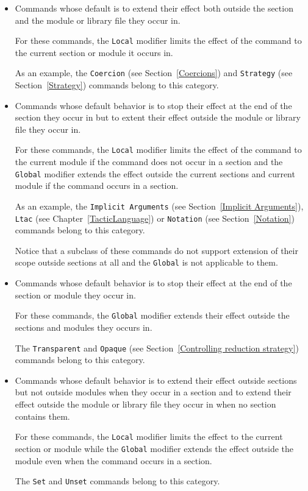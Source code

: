 \begin{itemize}
\item Commands whose default is to extend their effect both outside the
  section and the module or library file they occur in.

  For these commands, the {\tt Local} modifier limits the effect of
  the command to the current section or module it occurs in.

  As an example, the {\tt Coercion} (see Section~\ref{Coercions})
  and {\tt Strategy} (see Section~\ref{Strategy})
  commands belong to this category.

\item Commands whose default behavior is to stop their effect at the
  end of the section they occur in but to extent their effect outside
  the module or library file they occur in.

  For these commands, the {\tt Local} modifier limits the effect of
  the command to the current module if the command does not occur in a
  section and the {\tt Global} modifier extends the effect outside the
  current sections and current module if the command occurs in a
  section.

  As an example, the {\tt Implicit Arguments} (see
  Section~\ref{Implicit Arguments}), {\tt Ltac} (see
  Chapter~\ref{TacticLanguage}) or {\tt Notation} (see
  Section~\ref{Notation}) commands belong to this category.

  Notice that a subclass of these commands do not support extension of
  their scope outside sections at all and the {\tt Global} is not
  applicable to them.

\item Commands whose default behavior is to stop their effect at the
  end of the section or module they occur in.

  For these commands, the {\tt Global} modifier extends their effect
  outside the sections and modules they occurs in.

  The {\tt Transparent} and {\tt Opaque} (see
  Section~\ref{Controlling reduction strategy}) commands belong to
  this category.

\item Commands whose default behavior is to extend their effect
  outside sections but not outside modules when they occur in a
  section and to extend their effect outside the module or library
  file they occur in when no section contains them.

  For these commands, the {\tt Local} modifier limits the effect to
  the current section or module while the {\tt Global} modifier extends
  the effect outside the module even when the command occurs in a section.

  The {\tt Set} and {\tt Unset} commands belong to this category.
\end{itemize}


